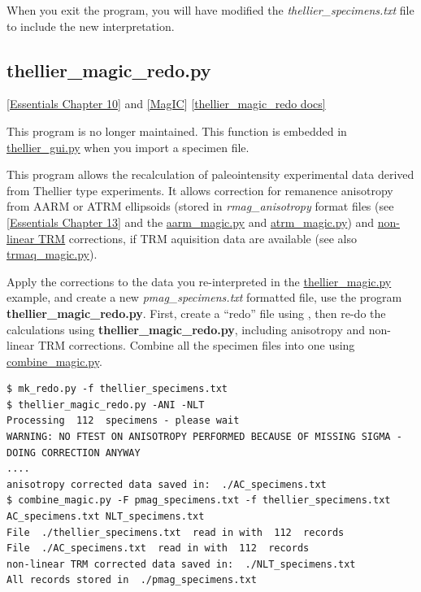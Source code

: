 \documentclass[11pt]{book}
\begin{document}
{When you exit the program, you will have modified the {\it thellier\_specimens.txt} file to include the new interpretation.



\subsection{thellier\_magic\_redo.py}
\href{http://earthref.org/MAGIC/books/Tauxe/Essentials/WebBook3ch10.html#ch10}{[Essentials Chapter 10]} and \href{#MagIC}{[MagIC}]
\href{https://github.com/PmagPy/PmagPy/blob/master/programs/thellier_magic_redo.py}{[thellier\_magic\_redo docs]}


This program is no longer maintained. This function is embedded in  \href{#thellier_GUI.py}{thellier\_gui.py} when you import a specimen file.



This program allows the recalculation of paleointensity experimental data derived from Thellier type experiments.  It allows correction for remanence  anisotropy from AARM or ATRM ellipsoids (stored in {\it rmag\_anisotropy} format files (see \href{http://earthref.org/MAGIC/books/Tauxe/Essentials/WebBook3ch13.html#ch13}{[Essentials Chapter 13]} and the \href{#aarm_magic.py}{aarm\_magic.py} and \href{#atrm_magic.py}{atrm\_magic.py}) and \href{http://earthref.org/MAGIC/books/Tauxe/Essentials/WebBook3ch10.html#non-linear_TRM}{non-linear TRM} corrections, if TRM aquisition data are available (see also \href{#trmaq_magic.py}{trmaq\_magic.py}).


Apply the corrections to the  data you re-interpreted in the \href{#thellier_magic.py}{thellier\_magic.py} example,   and create a new {\it pmag\_specimens.txt} formatted file, use the program {\bf thellier\_magic\_redo.py}.   First, create a ``redo'' file using \href{#mk_redo.py}, then re-do the calculations using {\bf thellier\_magic\_redo.py}, including anisotropy and non-linear TRM corrections.    Combine all the specimen files into one using \href{#combine_magic.py}{combine\_magic.py}.

\begin{verbatim}
$ mk_redo.py -f thellier_specimens.txt
$ thellier_magic_redo.py -ANI -NLT
Processing  112  specimens - please wait
WARNING: NO FTEST ON ANISOTROPY PERFORMED BECAUSE OF MISSING SIGMA - DOING CORRECTION ANYWAY
....
anisotropy corrected data saved in:  ./AC_specimens.txt
$ combine_magic.py -F pmag_specimens.txt -f thellier_specimens.txt AC_specimens.txt NLT_specimens.txt
File  ./thellier_specimens.txt  read in with  112  records
File  ./AC_specimens.txt  read in with  112  records
non-linear TRM corrected data saved in:  ./NLT_specimens.txt
All records stored in  ./pmag_specimens.txt
\end{verbatim}

}
\end{document}
